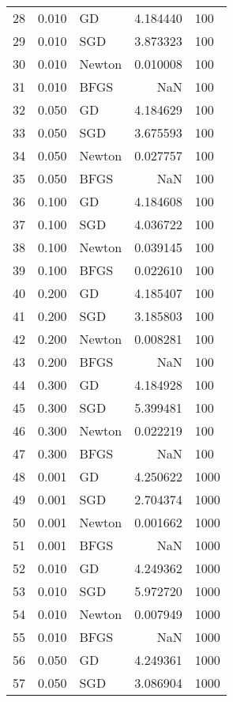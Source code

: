 \begin{tabular}{lrlrl}
28  &  0.010 &      GD &  4.184440 &      100 \\
29  &  0.010 &     SGD &  3.873323 &      100 \\
30  &  0.010 &  Newton &  0.010008 &      100 \\
31  &  0.010 &    BFGS &       NaN &      100 \\
32  &  0.050 &      GD &  4.184629 &      100 \\
33  &  0.050 &     SGD &  3.675593 &      100 \\
34  &  0.050 &  Newton &  0.027757 &      100 \\
35  &  0.050 &    BFGS &       NaN &      100 \\
36  &  0.100 &      GD &  4.184608 &      100 \\
37  &  0.100 &     SGD &  4.036722 &      100 \\
38  &  0.100 &  Newton &  0.039145 &      100 \\
39  &  0.100 &    BFGS &  0.022610 &      100 \\
40  &  0.200 &      GD &  4.185407 &      100 \\
41  &  0.200 &     SGD &  3.185803 &      100 \\
42  &  0.200 &  Newton &  0.008281 &      100 \\
43  &  0.200 &    BFGS &       NaN &      100 \\
44  &  0.300 &      GD &  4.184928 &      100 \\
45  &  0.300 &     SGD &  5.399481 &      100 \\
46  &  0.300 &  Newton &  0.022219 &      100 \\
47  &  0.300 &    BFGS &       NaN &      100 \\
48  &  0.001 &      GD &  4.250622 &     1000 \\
49  &  0.001 &     SGD &  2.704374 &     1000 \\
50  &  0.001 &  Newton &  0.001662 &     1000 \\
51  &  0.001 &    BFGS &       NaN &     1000 \\
52  &  0.010 &      GD &  4.249362 &     1000 \\
53  &  0.010 &     SGD &  5.972720 &     1000 \\
54  &  0.010 &  Newton &  0.007949 &     1000 \\
55  &  0.010 &    BFGS &       NaN &     1000 \\
56  &  0.050 &      GD &  4.249361 &     1000 \\
57  &  0.050 &     SGD &  3.086904 &     1000 \\

\end{tabular}
